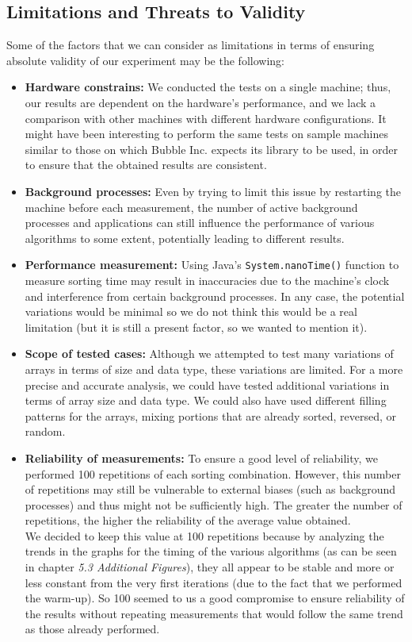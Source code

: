 \documentclass{article}
\begin{document}
\subsection{Limitations and Threats to Validity}
Some of the factors that we can consider as limitations in terms of ensuring absolute validity of our experiment may be the following:
\begin{itemize}
    \item \textbf{Hardware constrains:} We conducted the tests on a single machine; thus, our results are dependent on the hardware's performance, and we lack a comparison with other machines with different hardware configurations. It might have been interesting to perform the same tests on sample machines similar to those on which Bubble Inc. expects its library to be used, in order to ensure that the obtained results are consistent.
    \item \textbf{Background processes:} Even by trying to limit this issue by restarting the machine before each measurement, the number of active background processes and applications can still influence the performance of various algorithms to some extent, potentially leading to different results.
    \item \textbf{Performance measurement:} Using Java's \texttt{System.nanoTime()} function to measure sorting time may result in inaccuracies due to the machine's clock and interference from certain background processes. In any case, the potential variations would be minimal so we do not think this would be a real limitation (but it is still a present factor, so we wanted to mention it).
    \item \textbf{Scope of tested cases:} Although we attempted to test many variations of arrays in terms of size and data type, these variations are limited. For a more precise and accurate analysis, we could have tested additional variations in terms of array size and data type. We could also have used different filling patterns for the arrays, mixing portions that are already sorted, reversed, or random.
    \item \textbf{Reliability of measurements:} To ensure a good level of reliability, we performed 100 repetitions of each sorting combination. However, this number of repetitions may still be vulnerable to external biases (such as background processes) and thus might not be sufficiently high. The greater the number of repetitions, the higher the reliability of the average value obtained. \\ We decided to keep this value at 100 repetitions because by analyzing the trends in the graphs for the timing of the various algorithms (as can be seen in chapter \textit{5.3 Additional Figures}), they all appear to be stable and more or less constant from the very first iterations (due to the fact that we performed the warm-up). So 100 seemed to us a good compromise to ensure reliability of the results without repeating measurements that would follow the same trend as those already performed.
\end{itemize}
\end{document}
